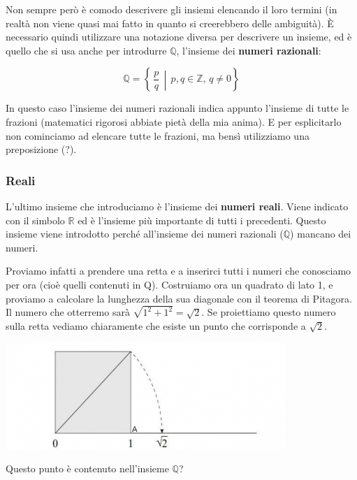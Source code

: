 Non sempre però è comodo descrivere gli insiemi elencando il loro termini (in realtà non viene quasi mai fatto in quanto si creerebbero delle ambiguità). È necessario quindi utilizzare una notazione diversa per descrivere un insieme, ed è quello che si usa anche per introdurre $\mathbb{Q}$, l'insieme dei \textbf{numeri razionali}:
\begin{center}
    \begin{equation*}
        \mathbb{Q} = \left\{\,\dfrac{p}{q}\, \middle| \, p, q \in \mathbb{Z},\, q \neq 0 \right\}
    \end{equation*}
\end{center}
In questo caso l'insieme dei numeri razionali indica appunto l'insieme di tutte le frazioni (matematici rigorosi abbiate pietà della mia anima). E per esplicitarlo non cominciamo ad elencare tutte le frazioni, ma bensì utilizziamo una preposizione (?).\\ %

\subsubsection{Reali}
L'ultimo insieme che introduciamo è l'insieme dei \textbf{numeri reali}. Viene indicato con il simbolo $\mathbb{R}$ ed è l'insieme più importante di tutti i precedenti. Questo insieme viene introdotto perché all'insieme dei numeri razionali ($\mathbb{Q}$) mancano dei numeri.

Proviamo infatti a prendere una retta e a inserirci tutti i numeri che conosciamo per ora (cioè quelli contenuti in Q). Costruiamo ora un quadrato di lato 1, e proviamo a calcolare la lunghezza della sua diagonale con il teorema di Pitagora. Il numero che otterremo sarà $\sqrt{1^2+1^2} = \sqrt{2}$. Se proiettiamo questo numero sulla retta vediamo chiaramente che esiste un punto che corrisponde a $\sqrt{2}$.

\includegraphics[]{../img/sqrt2.png}

Questo punto è contenuto nell'insieme $\mathbb{Q}$? 

